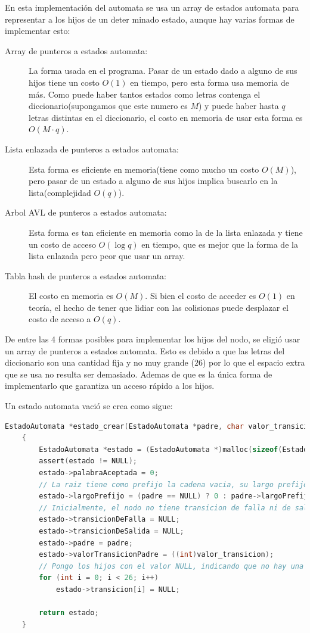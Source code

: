 \documentclass{article}
\begin{document}
En esta implementación del automata se usa un array de estados automata para representar a los hijos de un deter
minado estado, aunque hay varias formas de implementar esto:
\begin{description}
    \item[Array de punteros a estados automata:] La forma usada en el programa. Pasar de un estado dado a alguno de sus hijos
    tiene un costo $O(1)$ en tiempo, pero esta forma usa memoria de más. Como puede haber tantos estados como letras contenga el diccionario(supongamos que este numero es $M$) y puede haber hasta $q$ letras
    distintas en el diccionario, el costo en memoria de usar esta forma es $O(M \cdot q)$.
    \item[Lista enlazada de punteros a estados automata:] Esta forma es eficiente en memoria(tiene como mucho un costo $O(M)$), pero pasar de un
    estado a alguno de sus hijos implica buscarlo en la lista(complejidad $O(q)$).
    \item[Arbol AVL de punteros a estados automata:] Esta forma es tan eficiente en memoria como la de la lista enlazada y tiene un costo de acceso
    $O(\log q)$ en tiempo, que es mejor que la forma de la lista enlazada pero peor que usar un array.
    \item[Tabla hash de punteros a estados automata:] El costo en memoria es $O(M)$. Si bien el costo de acceder es $O(1)$ en teoría, el hecho de tener
    que lidiar con las colisionas puede desplazar el costo de acceso a $O(q)$.
\end{description}

De entre las 4 formas posibles para implementar los hijos del nodo, se eligió usar un array de punteros a estados automata. Esto es debido a que las letras
del diccionario son una cantidad fija y no muy grande ($26$) por lo que el espacio extra que se usa no resulta ser demasiado. Ademas de que es la única forma de implementarlo
que garantiza un acceso rápido a los hijos.

Un estado automata vació se crea como sigue:
\begin{lstlisting}[language=C]
    EstadoAutomata *estado_crear(EstadoAutomata *padre, char valor_transicion)
    {
        EstadoAutomata *estado = (EstadoAutomata *)malloc(sizeof(EstadoAutomata));
        assert(estado != NULL);
        estado->palabraAceptada = 0;
        // La raiz tiene como prefijo la cadena vacia, su largo prefijo es 0
        estado->largoPrefijo = (padre == NULL) ? 0 : padre->largoPrefijo + 1;
        // Inicialmente, el nodo no tiene transicion de falla ni de salida
        estado->transicionDeFalla = NULL;
        estado->transicionDeSalida = NULL;
        estado->padre = padre;
        estado->valorTransicionPadre = ((int)valor_transicion);
        // Pongo los hijos con el valor NULL, indicando que no hay una transicion
        for (int i = 0; i < 26; i++)
            estado->transicion[i] = NULL;

        return estado;
    }
\end{lstlisting}
\end{document}
